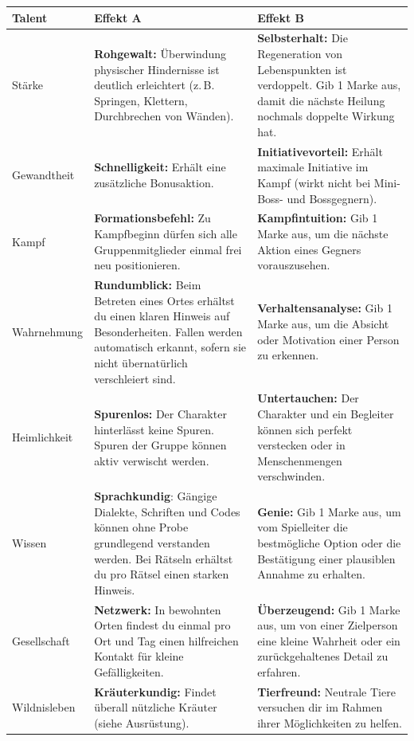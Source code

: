 \begin{center}
	\begin{tabular}{lp{6.5cm}p{6.5cm}}
		\toprule
		\textbf{Talent} & \textbf{Effekt A} & \textbf{Effekt B} \\
		\midrule
		Stärke &
		\textbf{Rohgewalt:} Überwindung physischer Hindernisse ist deutlich erleichtert
		(z.\,B. Springen, Klettern, Durchbrechen von Wänden). &
		\textbf{Selbsterhalt:} Die Regeneration von Lebenspunkten ist verdoppelt.
		Gib 1 Marke aus, damit die nächste Heilung nochmals doppelte Wirkung hat. \\
		
		Gewandtheit &
		\textbf{Schnelligkeit:} Erhält eine zusätzliche Bonusaktion. &
		\textbf{Initiativevorteil:} Erhält maximale Initiative im Kampf (wirkt nicht bei Mini-Boss- und Bossgegnern). \\
		
		Kampf &
		\textbf{Formationsbefehl:} Zu Kampfbeginn dürfen sich alle Gruppenmitglieder einmal
		frei neu positionieren. &
		\textbf{Kampfintuition:} Gib 1 Marke aus, um die nächste Aktion eines Gegners vorauszusehen. \\
		
		Wahrnehmung &
		\textbf{Rundumblick:} Beim Betreten eines Ortes erhältst du einen klaren Hinweis
		auf Besonderheiten. Fallen werden automatisch erkannt, sofern sie nicht übernatürlich verschleiert sind. &
		\textbf{Verhaltensanalyse:} Gib 1 Marke aus, um die Absicht oder Motivation einer Person zu erkennen. \\
		
		Heimlichkeit &
		\textbf{Spurenlos:} Der Charakter hinterlässt keine Spuren.
		Spuren der Gruppe können aktiv verwischt werden. &
		\textbf{Untertauchen:} Der Charakter und ein Begleiter können sich perfekt
		verstecken oder in Menschenmengen verschwinden. \\
		
		Wissen &
		\textbf{Sprachkundig}: Gängige Dialekte, Schriften und Codes können ohne Probe
		grundlegend verstanden werden. Bei Rätseln erhältst du pro Rätsel
		einen starken Hinweis. &
		\textbf{Genie:} Gib 1 Marke aus, um vom Spielleiter die bestmögliche Option
		oder die Bestätigung einer plausiblen Annahme zu erhalten. \\
		
		Gesellschaft &
		\textbf{Netzwerk:} In bewohnten Orten findest du einmal pro Ort und Tag
		einen hilfreichen Kontakt für kleine Gefälligkeiten. &
		\textbf{Überzeugend:} Gib 1 Marke aus, um von einer Zielperson eine kleine Wahrheit
		oder ein zurückgehaltenes Detail zu erfahren. \\
		
		Wildnisleben &
		\textbf{Kräuterkundig:} Findet überall nützliche Kräuter (siehe Ausrüstung). &
		\textbf{Tierfreund:} Neutrale Tiere versuchen dir im Rahmen ihrer Möglichkeiten
		zu helfen. \\
		\bottomrule
	\end{tabular}
\end{center}




